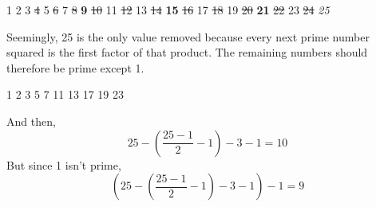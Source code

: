 \documentclass[12pt, letterpaper, twosided]{report}
\begin{document}
\begin{center}
1 \hspace{0.5cm}2 \hspace{0.5cm}3 \hspace{0.5cm}\sout{4} \hspace{0.5cm}5 \hspace{0.5cm}\sout{6} \hspace{0.5cm}7 \hspace{0.5cm}\sout{8} \hspace{0.5cm}\textbf{9} \hspace{0.5cm}\sout{10} \hspace{0.5cm}11 \hspace{0.5cm}\sout{12} \hspace{0.5cm}13 \hspace{0.5cm}\sout{14} \hspace{0.5cm}\textbf{15} \hspace{0.5cm}\sout{16} \hspace{0.5cm}17 \hspace{0.5cm}\sout{18} \hspace{0.5cm}19 \hspace{0.5cm}\sout{20} \hspace{0.5cm}\textbf{21} \hspace{0.5cm}\sout{22} \hspace{0.5cm}23 \hspace{0.5cm}\sout{24} \hspace{0.5cm}\textit{25}
\end{center}
Seemingly, 25 is the only value removed because every next prime number squared is the first factor of that product. The remaining numbers should therefore be prime except 1.
\begin{center}
1 \hspace{0.5cm}2 \hspace{0.5cm}3 \hspace{0.5cm}5 \hspace{0.5cm}7 \hspace{0.5cm}11 \hspace{0.5cm}13 \hspace{0.5cm}17 \hspace{0.5cm}19 \hspace{0.5cm}23
\end{center}
And then,
$$25-(\frac{25-1}{2}-1)-3-1 = 10$$
But since 1 isn't prime,
$$(25-(\frac{25-1}{2}-1)-3-1)-1 = 9$$
\begin{center}
\end{center}
\end{document}
